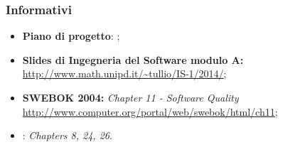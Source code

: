 		\subsubsection{Informativi}
			\begin{itemize}
  				\item \textbf{Piano di progetto}: \docNameVersionPdP;
  				\item \textbf{Slides di Ingegneria del Software modulo A:} \url{http://www.math.unipd.it/~tullio/IS-1/2014/};
  				\item \textbf{SWEBOK 2004:} \textit{Chapter 11 - Software Quality} \url{http://www.computer.org/portal/web/swebok/html/ch11};
  				\item \textbf{\sommerville}: \textit{Chapters 8, 24, 26}.
			\end{itemize}
			\pagebreak